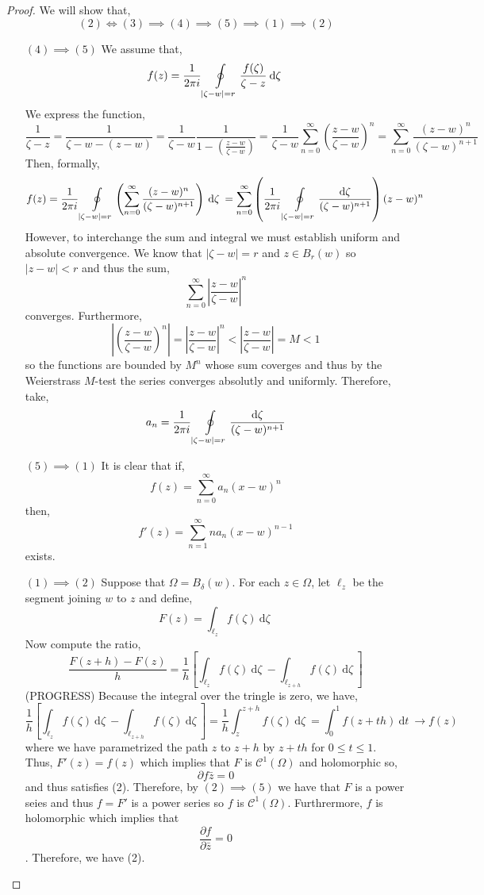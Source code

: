 \documentclass[12pt]{extarticle}
\renewcommand{\d}[1]{\: \mathrm{d}#1 \:}
\newcommand{\pderiv}[2]{\frac{\partial{#1}}{\partial{#2}}}
\theoremstyle{definition}
\newcommand{\Class}[2]{\mathcal{C}^{#1} \left( #2 \right)}
\begin{document}
\begin{proof}
We will show that,
\[ (2) \iff (3) \implies (4) \implies (5) \implies (1) \implies (2) \]
\begin{enumerate}
\item[$(4) \implies (5) $]
We assume that,
\[ f(z) = \frac{1}{2 \pi i} \oint\displaylimits_{|\zeta - w| = r} \frac{f(\zeta)}{\zeta - z} 
\d{\zeta} \]
We express the function,
\[ \frac{1}{\zeta - z} = \frac{1}{\zeta - w - (z - w)} = \frac{1}{\zeta - w} \frac{1}{1 - \left( \frac{z -w}{\zeta - w} \right)} = \frac{1}{\zeta - w} \sum_{n = 0}^\infty \left( \frac{z - w}{\zeta - w} \right)^n = \sum_{n = 0}^{\infty} \frac{(z - w)^n}{(\zeta - w)^{n+1}} \]
Then, formally,
\[ f(z) = \frac{1}{2 \pi i} \oint\displaylimits_{|\zeta - w| = r} \left( \sum_{n = 0}^{\infty} \frac{(z - w)^n}{(\zeta - w)^{n+1}} \right) \d{\zeta} = \sum_{n = 0}^\infty \left( \frac{1}{2 \pi i} \oint\displaylimits_{|\zeta - w| = r} \frac{\d{\zeta}}{(\zeta - w)^{n+1}} \right) (z - w)^n \]
However, to interchange the sum and integral we must establish uniform and absolute convergence. We know that $| \zeta - w | = r$ and $z \in B_r(w)$ so $|z - w| < r$ and thus the sum,
\[ \sum_{n = 0}^\infty \left| \frac{z - w}{\zeta - w} \right|^n  \]
converges. Furthermore, 
\[ \left| \left( \frac{z - w}{\zeta - w} \right)^n \right| = \left| \frac{z - w}{\zeta - w} \right|^n < \left| \frac{z - w}{\zeta - w} \right| = M < 1 \]
so the functions are bounded by $M^n$ whose sum coverges and thus by the Weierstrass $M$-test the series converges absolutly and uniformly. Therefore,
take,
\[ a_n = \frac{1}{2 \pi i} \oint\displaylimits_{|\zeta - w| = r} \frac{\d{\zeta}}{(\zeta - w)^{n+1}} \]
\item[$(5) \implies (1)$]
It is clear that if,
\[ f(z) = \sum_{n = 0}^\infty a_n(x - w)^n \]
then,
\[ f'(z) = \sum_{n = 1}^\infty n a_n(x - w)^{n-1} \]
exists. 
\item[$(1) \implies (2)$]
Suppose that $\Omega = B_{\delta}(w)$. For each $z \in \Omega$, let $\ell_z$ be the segment joining $w$ to $z$ and define,
\[ F(z) = \int_{\ell_z} f(\zeta) \d{\zeta} \] 
Now compute the ratio,
\[ \frac{F(z + h) - F(z)}{h} = \frac{1}{h} \left[ \int_{\ell_z} f(\zeta) \d{\zeta} - \int_{\ell_{z + h}} f(\zeta) \d{\zeta} \right] \]
(PROGRESS)
Because the integral over the tringle is zero, we have,
\[ \frac{1}{h} \left[ \int_{\ell_z} f(\zeta) \d{\zeta} - \int_{\ell_{z + h}} f(\zeta) \d{\zeta} \right] = \frac{1}{h} \int_{z}^{z + h} f(\zeta) \d{\zeta} = \int_0^1 f(z + th) \d{t} \to f(z) \]
where we have parametrized the path $z$ to $z + h$ by $z + th$ for $0 \le t \le 1$. 
Thus, $F'(z) = f(z)$ which implies that $F$ is $\Class{1}{\Omega}$ and holomorphic so,
\[ \partial{f}{\bar{z}} = 0 \]
and thus satisfies (2). Therefore, by $(2) \implies (5)$ we have that $F$ is a power seies and thus $f = F'$ is a power series so $f$ is $\Class{1}{\Omega}$. Furthrermore, $f$ is holomorphic which implies that 
\[ \pderiv{f}{\bar{z}} = 0 \].
Therefore, we have (2). 
\end{enumerate}
\end{proof}
\end{document}
